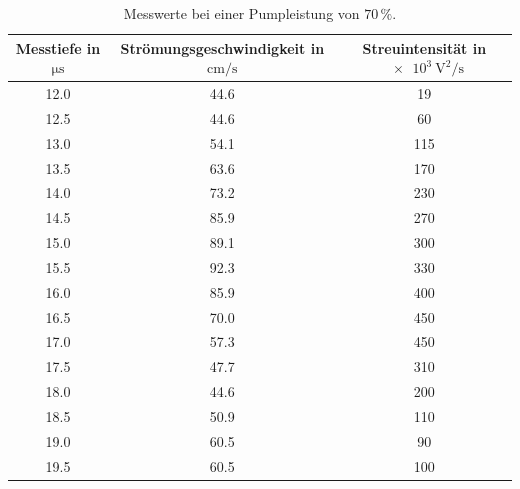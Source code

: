 %    

\begin{table}
    \centering
    \caption{Messwerte bei einer Pumpleistung von $70\,\%$.}
    \label{tab:70percent}
    \begin{tabular}{c c c}
        \toprule
        Messtiefe in $\si{\micro\second}$ & Strömungsgeschwindigkeit in $\si{\centi\meter\per\second}$ & Streuintensität in $\SI{e3}{\volt\squared\per\second}$ \\
        \midrule
        12.0 & 44.6 &  19 \\
        12.5 & 44.6 &  60 \\
        13.0 & 54.1 & 115 \\
        13.5 & 63.6 & 170 \\
        14.0 & 73.2 & 230 \\
        14.5 & 85.9 & 270 \\
        15.0 & 89.1 & 300 \\
        15.5 & 92.3 & 330 \\
        16.0 & 85.9 & 400 \\
        16.5 & 70.0 & 450 \\
        17.0 & 57.3 & 450 \\
        17.5 & 47.7 & 310 \\
        18.0 & 44.6 & 200 \\
        18.5 & 50.9 & 110 \\
        19.0 & 60.5 &  90 \\
        19.5 & 60.5 & 100 \\
        \bottomrule
    \end{tabular}
\end{table}

